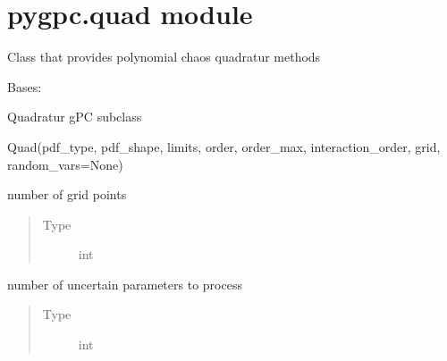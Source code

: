 \documentclass[letterpaper,10pt,english,openany,oneside]{sphinxmanual}
\begin{document}
\section{pygpc.quad module}
\label{\detokenize{pygpc:module-pygpc.quad}}\label{\detokenize{pygpc:pygpc-quad-module}}
Class that provides polynomial chaos quadratur methods

\begin{fulllineitems}
\label{\detokenize{pygpc:pygpc.quad.Quad}}
Bases: {\hyperref[\detokenize{pygpc:pygpc.gpc.gPC}]{}}

Quadratur gPC subclass

Quad(pdf\_type, pdf\_shape, limits, order, order\_max, interaction\_order, grid, random\_vars=None)

\begin{fulllineitems}
\label{\detokenize{pygpc:pygpc.quad.Quad.N_grid}}
number of grid points
\begin{quote}\begin{description}
\item[{Type}] \leavevmode
int

\end{description}\end{quote}

\end{fulllineitems}


\begin{fulllineitems}
\label{\detokenize{pygpc:pygpc.quad.Quad.dim}}
number of uncertain parameters to process
\begin{quote}\begin{description}
\item[{Type}] \leavevmode
int

\end{description}\end{quote}

\end{fulllineitems}


\end{fulllineitems}
\end{document}
